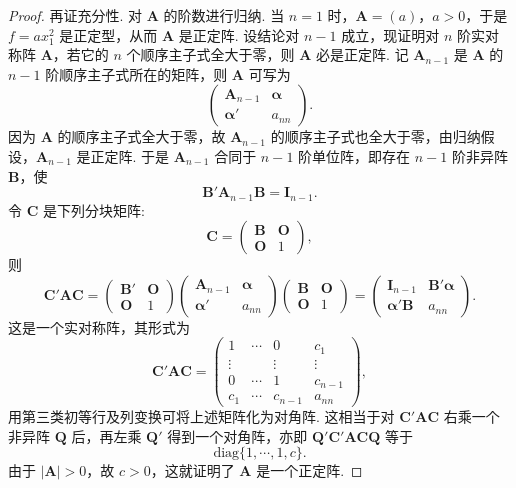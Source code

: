 \documentclass[../../main.tex]{subfiles}
\begin{document}
\begin{proof}
再证充分性. 对 $\boldsymbol{A}$ 的阶数进行归纳. 当 $n = 1$ 时，$\boldsymbol{A}=(a)$，$a>0$，于是 $f = ax_1^2$ 是正定型，从而 $\boldsymbol{A}$ 是正定阵. 设结论对 $n - 1$ 成立，现证明对 $n$ 阶实对称阵 $\boldsymbol{A}$，若它的 $n$ 个顺序主子式全大于零，则 $\boldsymbol{A}$ 必是正定阵. 记 $\boldsymbol{A}_{n - 1}$ 是 $\boldsymbol{A}$ 的 $n - 1$ 阶顺序主子式所在的矩阵，则 $\boldsymbol{A}$ 可写为
\[
\begin{pmatrix}
\boldsymbol{A}_{n - 1} & \boldsymbol{\alpha}\\
\boldsymbol{\alpha}' & a_{nn}
\end{pmatrix}.
\]
因为 $\boldsymbol{A}$ 的顺序主子式全大于零，故 $\boldsymbol{A}_{n - 1}$ 的顺序主子式也全大于零，由归纳假设，$\boldsymbol{A}_{n - 1}$ 是正定阵. 于是 $\boldsymbol{A}_{n - 1}$ 合同于 $n - 1$ 阶单位阵，即存在 $n - 1$ 阶非异阵 $\boldsymbol{B}$，使
\[
\boldsymbol{B}'\boldsymbol{A}_{n - 1}\boldsymbol{B}=\boldsymbol{I}_{n - 1}.
\]
令 $\boldsymbol{C}$ 是下列分块矩阵:
\[
\boldsymbol{C}=\begin{pmatrix}
\boldsymbol{B} & \boldsymbol{O}\\
\boldsymbol{O} & 1
\end{pmatrix},
\]
则
\[
\boldsymbol{C}'\boldsymbol{A}\boldsymbol{C}=\begin{pmatrix}
\boldsymbol{B}' & \boldsymbol{O}\\
\boldsymbol{O} & 1
\end{pmatrix}
\begin{pmatrix}
\boldsymbol{A}_{n - 1} & \boldsymbol{\alpha}\\
\boldsymbol{\alpha}' & a_{nn}
\end{pmatrix}
\begin{pmatrix}
\boldsymbol{B} & \boldsymbol{O}\\
\boldsymbol{O} & 1
\end{pmatrix}=
\begin{pmatrix}
\boldsymbol{I}_{n - 1} & \boldsymbol{B}'\boldsymbol{\alpha}\\
\boldsymbol{\alpha}'\boldsymbol{B} & a_{nn}
\end{pmatrix}.
\]
这是一个实对称阵，其形式为
\[
\boldsymbol{C}'\boldsymbol{A}\boldsymbol{C}=\begin{pmatrix}
1 & \cdots & 0 & c_1\\
\vdots & & \vdots & \vdots\\
0 & \cdots & 1 & c_{n - 1}\\
c_1 & \cdots & c_{n - 1} & a_{nn}
\end{pmatrix},
\]
用第三类初等行及列变换可将上述矩阵化为对角阵. 这相当于对 $\boldsymbol{C}'\boldsymbol{A}\boldsymbol{C}$ 右乘一个非异阵 $\boldsymbol{Q}$ 后，再左乘 $\boldsymbol{Q}'$ 得到一个对角阵，亦即 $\boldsymbol{Q}'\boldsymbol{C}'\boldsymbol{A}\boldsymbol{C}\boldsymbol{Q}$ 等于
\[
\mathrm{diag}\{1,\cdots,1,c\}.
\]
由于 $|\boldsymbol{A}|>0$，故 $c>0$，这就证明了 $\boldsymbol{A}$ 是一个正定阵. 
\end{proof}
\end{document}
